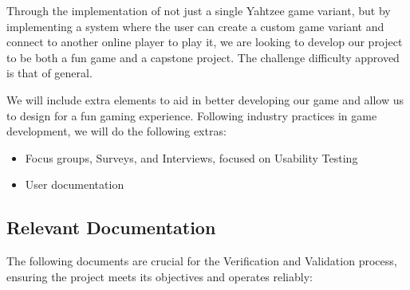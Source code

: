 \documentclass[12pt, titlepage]{article}
\begin{document}
\fi

Through the implementation of not just a single Yahtzee game variant, but by implementing a system where the user can create a custom game variant and connect to another online player to play it, we are looking to develop our project to be both a fun game and a capstone project. The challenge difficulty approved is that of general.

\iffalse
, we are looking to achieve the advanced challenge level. We would also provide some pre-set game variants that have been tested and were found to be more fun than others.
\fi

We will include extra elements to aid in better developing our game and allow us to design for a fun gaming experience. Following industry practices in game development, we will do the following extras:
\begin{itemize}
	\item Focus groups, Surveys, and Interviews, focused on Usability Testing
	\item User documentation
\end{itemize}

\subsection{Relevant Documentation}

\iffalse
\wss{Reference relevant documentation.  This will definitely include your SRS
  and your other project documents (design documents, like MG, MIS, etc).  You
  can include these even before they are written, since by the time the project
  is done, they will be written.  You can create BibTeX entries for your
  documents and within those entries include a hyperlink to the documents.}
\citet{SRS}
\wss{Don't just list the other documents.  You should explain why they are relevant and 
how they relate to your VnV efforts.}
\fi

The following documents are crucial for the Verification and Validation process, ensuring the project meets its objectives and operates reliably:
\end{document}
